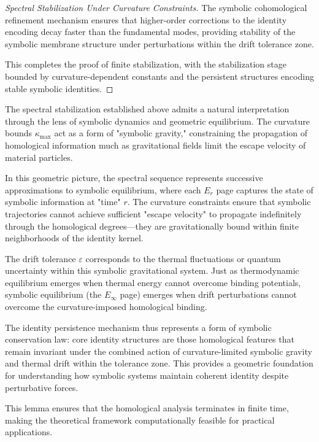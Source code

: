 \begin{proof}[Spectral Stabilization Under Curvature Constraints]
The symbolic cohomological refinement mechanism ensures that higher-order corrections to the identity encoding decay faster than the fundamental modes, providing stability of the symbolic membrane structure under perturbations within the drift tolerance zone.

This completes the proof of finite stabilization, with the stabilization stage bounded by curvature-dependent constants and the persistent structures encoding stable symbolic identities.
\end{proof}

\begin{scholium}
\label{scholium:towards_symbolic_equilibrium}
The spectral stabilization established above admits a natural interpretation through the lens of symbolic dynamics and geometric equilibrium. The curvature bounds $\kappa_{\max}$ act as a form of "symbolic gravity," constraining the propagation of homological information much as gravitational fields limit the escape velocity of material particles.

In this geometric picture, the spectral sequence represents successive approximations to symbolic equilibrium, where each $E_r$ page captures the state of symbolic information at "time" $r$. The curvature constraints ensure that symbolic trajectories cannot achieve sufficient "escape velocity" to propagate indefinitely through the homological degrees—they are gravitationally bound within finite neighborhoods of the identity kernel.

The drift tolerance $\varepsilon$ corresponds to the thermal fluctuations or quantum uncertainty within this symbolic gravitational system. Just as thermodynamic equilibrium emerges when thermal energy cannot overcome binding potentials, symbolic equilibrium (the $E_\infty$ page) emerges when drift perturbations cannot overcome the curvature-imposed homological binding.

The identity persistence mechanism thus represents a form of symbolic conservation law: core identity structures are those homological features that remain invariant under the combined action of curvature-limited symbolic gravity and thermal drift within the tolerance zone. This provides a geometric foundation for understanding how symbolic systems maintain coherent identity despite perturbative forces.
\end{scholium}

This lemma ensures that the homological analysis terminates in finite time, making the theoretical framework computationally feasible for practical applications.

